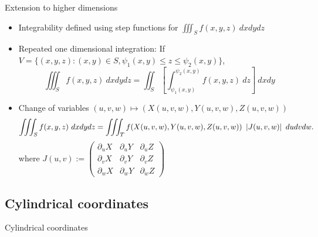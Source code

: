 % 








% 


{Extension to higher dimensions}



\begin{itemize}
    \item Integrability defined using step functions for \(\iiint_{S} f(x,y,z) \ dxdydz\)
    \item Repeated one dimensional integration: If \(V = \{(x,y,z) : (x,y) \in S, \psi_1(x,y) \leq z \leq \psi_2(x,y)\}\),
          \[
              \iiint_{S} f(x,y,z) \ dxdydz = \iint_{S} \left[\int_{\psi_1(x,y)}^{\psi_2(x,y)} f(x,y,z)\ dz\right] \ dxdy
          \]
    \item Change of variables \((u,v,w) \mapsto (X(u,v,w),Y(u,v,w),Z(u,v,w))\)
          \[
              \iiint_{S} f(x,y,z) \ dxdydz = \iiint_{T} f(X(u,v,w),Y(u,v,w),Z(u,v,w)) \ \left|J(u,v,w)\right| \ dudvdw.
          \]
          where
          \(J(u,v):= \begin{pmatrix}
              \partial_u X & \partial_u Y & \partial_u Z \\ \partial_v X & \partial_v Y & \partial_v Z \\ \partial_w X & \partial_w Y & \partial_w Z
          \end{pmatrix}\)
\end{itemize}



\subsection{Cylindrical coordinates}


{Cylindrical coordinates}



